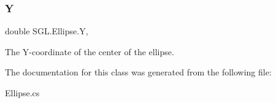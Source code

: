 \subsubsection{\texorpdfstring{Y}{Y}}
{\footnotesize\ttfamily double S\+G\+L.\+Ellipse.\+Y\hspace{0.3cm}{\ttfamily [get]}, {\ttfamily [set]}}



The Y-\/coordinate of the center of the ellipse. 



The documentation for this class was generated from the following file\+:\begin{DoxyCompactItemize}
\item 
Ellipse.\+cs\end{DoxyCompactItemize}
